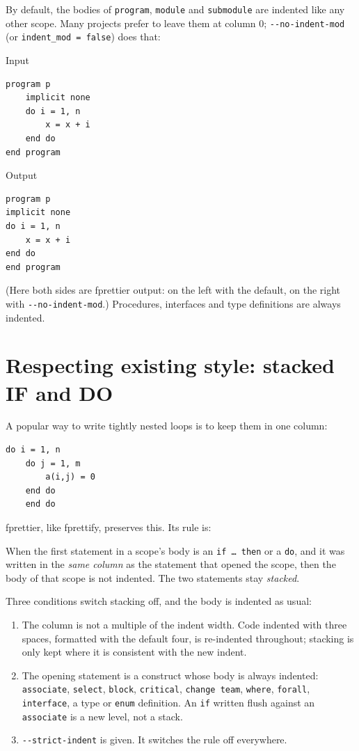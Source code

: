 \documentclass[11pt,a4paper,openany]{book}
\newcommand{\code}[1]{\texttt{\small #1}}
\newcommand{\flag}[1]{\texttt{\small -{}-#1}}
\newenvironment{beforecol}{\noindent\begin{minipage}[t]{0.485\linewidth}\textsf{\footnotesize\color{commentc}Input}}{\end{minipage}\hfill}
\newenvironment{aftercol}{\begin{minipage}[t]{0.485\linewidth}\textsf{\footnotesize\color{commentc}Output}}{\end{minipage}\par\medskip}
\begin{document}
By default, the bodies of \code{program}, \code{module} and \code{submodule}
are indented like any other scope. Many projects prefer to leave them at column
0; \flag{no-indent-mod} (or \code{indent\_mod = false}) does that:

\begin{beforecol}
\begin{lstlisting}[style=after]
program p
    implicit none
    do i = 1, n
        x = x + i
    end do
end program
\end{lstlisting}
\end{beforecol}
\begin{aftercol}
\begin{lstlisting}[style=after]
program p
implicit none
do i = 1, n
    x = x + i
end do
end program
\end{lstlisting}
\end{aftercol}

(Here both sides are fprettier output: on the left with the default, on the
right with \flag{no-indent-mod}.) Procedures, interfaces and type definitions
are always indented.

\section{Respecting existing style: stacked IF and DO}\label{sec:stacking}

A popular way to write tightly nested loops is to keep them in one column:

\begin{lstlisting}[style=fortran]
    do i = 1, n
    do j = 1, m
        a(i,j) = 0
    end do
    end do
\end{lstlisting}

fprettier, like fprettify, preserves this. Its rule is:

\begin{keyidea}
When the first statement in a scope's body is an \code{if \ldots{} then} or a
\code{do}, and it was written in the \emph{same column} as the statement that
opened the scope, then the body of that scope is not indented. The two
statements stay \emph{stacked}.
\end{keyidea}

Three conditions switch stacking off, and the body is indented as usual:

\begin{enumerate}
  \item The column is not a multiple of the indent width. Code indented with
    three spaces, formatted with the default four, is re-indented throughout;
    stacking is only kept where it is consistent with the new indent.
  \item The opening statement is a construct whose body is always indented:
    \code{associate}, \code{select}, \code{block}, \code{critical},
    \code{change team}, \code{where}, \code{forall}, \code{interface}, a type
    or \code{enum} definition. An \code{if} written flush against an
    \code{associate} is a new level, not a stack.
  \item \flag{strict-indent} is given. It switches the rule off everywhere.
\end{enumerate}
\end{document}
